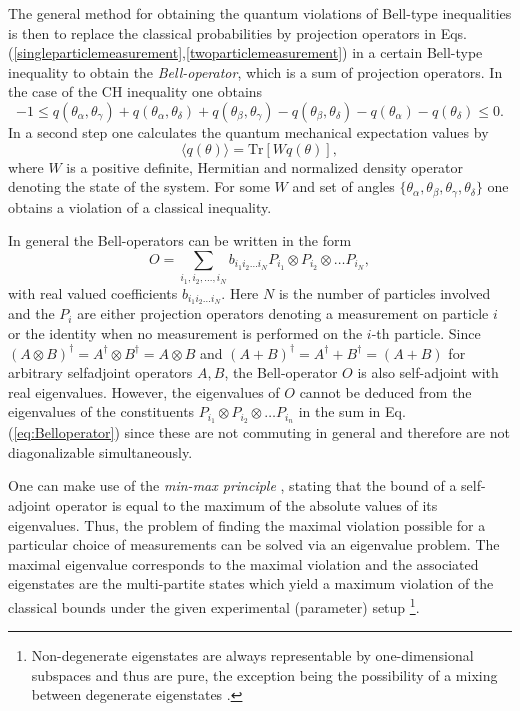 \documentclass[pra,amsmath,amsfonts,showkeys,showpacs,preprint]{revtex4}
\begin{document}
The general method for obtaining the quantum violations of Bell-type
inequalities is then to replace the classical probabilities by
projection operators in
Eqs. (\ref{singleparticlemeasurement},\ref{twoparticlemeasurement}) in
a certain Bell-type inequality
to obtain the \emph{Bell-operator}, which is a sum of projection
operators. In the case of the CH inequality one obtains
\begin{equation}
  -1\leq q(\theta_\alpha,\theta_\gamma) +
  q(\theta_\alpha,\theta_\delta) + q(\theta_\beta,\theta_\gamma) -
  q(\theta_\beta,\theta_\delta) - q(\theta_\alpha) - q(\theta_\delta)
  \leq 0.
\end{equation}
In a second step one calculates the quantum
mechanical expectation values by
\begin{equation}
  \label{eq:expect}
  \langle q(\theta) \rangle = \mbox{Tr}[W q(\theta)],
\end{equation}
where $W$ is a positive definite, Hermitian and normalized density
operator denoting the state of the system. For some $W$ and set of
angles $\{\theta_\alpha,\theta_\beta,\theta_\gamma,\theta_\delta\}$
one obtains a violation of a classical inequality.


In general the Bell-operators can be written in the form
\begin{equation}
  \label{eq:Belloperator}
  O =  \sum_{i_1,i_2,\ldots,i_N} b_{i_1i_2\ldots i_N} P_{i_1}\otimes
    P_{i_2} \otimes \ldots P_{i_N},
\end{equation}
with real valued coefficients $b_{i_1i_2\ldots i_N}$.
Here $N$ is the number of particles involved and the $P_i$ are either
projection operators denoting a measurement on particle $i$ or the
identity when no measurement is performed on the $i$-th particle. Since  $(A \otimes B)^\dagger = A^\dagger
\otimes B^\dagger = A \otimes B$ and $(A+B)^\dagger = A^\dagger +
B^\dagger = (A+B)$ for arbitrary selfadjoint operators $A,B$, the
Bell-operator $O$ is also self-adjoint with real eigenvalues. However,
the eigenvalues of $O$ cannot be deduced from the eigenvalues of the
constituents $P_{i_1}\otimes
    P_{i_2} \otimes \ldots P_{i_n}$ in the sum in
    Eq. (\ref{eq:Belloperator}) since these are not commuting in
    general and therefore are not diagonalizable simultaneously.

    One can make use of the \emph{min-max principle} \cite[\S
    90]{halmos74}, stating that the bound of a
    self-adjoint operator is equal to the maximum of the absolute
    values of its eigenvalues. Thus, the problem of finding the
    maximal violation possible for a particular choice of measurements
    can be solved via an
    eigenvalue problem. The maximal eigenvalue corresponds to the
    maximal violation and the associated eigenstates are the
    multi-partite states which yield a maximum violation of the
    classical bounds under the given experimental (parameter) setup
    \footnote{Non-degenerate eigenstates are always representable by
      one-dimensional subspaces and thus are pure, the exception being
      the possibility of a mixing between degenerate eigenstates
      \cite{braunstein92}.}.
\end{document}

